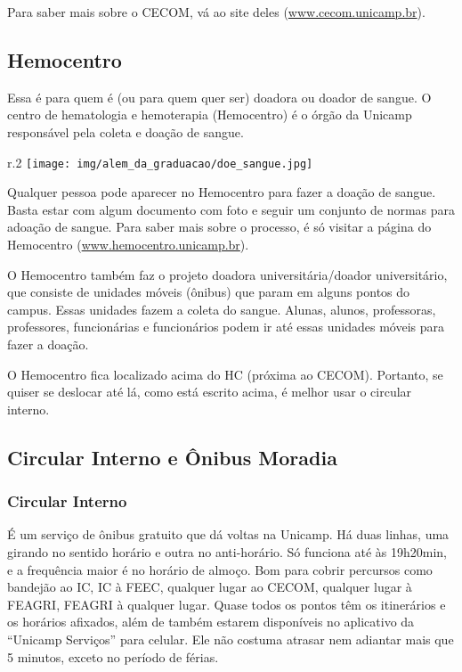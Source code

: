 Para saber mais sobre o CECOM, vá ao site deles (\url{www.cecom.unicamp.br}).

\subsection{Hemocentro}

Essa é para quem é (ou para quem quer ser) doadora ou doador de sangue. O
centro de hematologia e hemoterapia (Hemocentro) é o órgão da Unicamp
responsável pela coleta e doação de sangue.

\begin{wrapfigure}{r}{.2\textwidth}
    \centering
    \texttt{[image: img/alem\_da\_graduacao/doe\_sangue.jpg]}
\end{wrapfigure}

Qualquer pessoa pode aparecer no Hemocentro para fazer a doação de sangue.
Basta estar com algum documento com foto e seguir um conjunto de normas para
adoação de sangue. Para saber mais sobre o processo, é só visitar a página do
Hemocentro (\url{www.hemocentro.unicamp.br}).

O Hemocentro também faz o projeto doadora universitária/doador universitário,
que consiste de unidades móveis (ônibus) que param em alguns pontos do campus.
Essas unidades fazem a coleta do sangue. Alunas, alunos, professoras,
professores, funcionárias e funcionários podem ir até essas unidades móveis
para fazer a doação.

O Hemocentro fica localizado acima do HC (próxima ao CECOM). Portanto, se
quiser se deslocar até lá, como está escrito acima, é melhor usar o circular
interno.

\subsection{Circular Interno e Ônibus Moradia}

\subsubsection{Circular Interno}
É um serviço de ônibus gratuito que dá voltas na Unicamp. Há duas linhas, uma
girando no sentido horário e outra no anti-horário. Só funciona até às
19h20min, e a frequência maior é no horário de almoço. Bom para cobrir
percursos como bandejão ao IC, IC à FEEC, qualquer lugar ao CECOM, qualquer
lugar à FEAGRI, FEAGRI à qualquer lugar. Quase todos os pontos têm os
itinerários e os horários afixados, além de também estarem disponíveis no
aplicativo da ``Unicamp Serviços'' para celular. Ele não costuma atrasar nem
adiantar mais que 5 minutos, exceto no período de férias.

